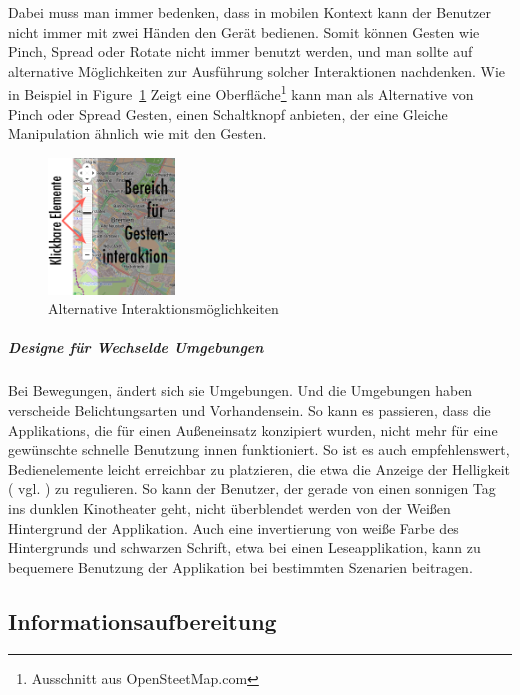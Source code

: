Dabei muss man immer bedenken, dass in mobilen Kontext kann der Benutzer nicht immer mit zwei Händen den Gerät bedienen. Somit können Gesten wie Pinch, Spread oder Rotate nicht immer benutzt werden, und man sollte auf alternative Möglichkeiten zur Ausführung solcher Interaktionen nachdenken. Wie in Beispiel in Figure~\ref{fig:nuibsp} Zeigt eine Oberfläche\footnote{Ausschnitt aus OpenSteetMap.com} kann man als Alternative von Pinch oder Spread Gesten, einen Schaltknopf anbieten, der eine Gleiche Manipulation ähnlich wie mit den Gesten.

\begin{figure}
	\begin{center}
	
	\includegraphics[width=0.3\textwidth]{img/NUIbsp.png}
	\caption{Alternative Interaktionsmöglichkeiten}\label{fig:nuibsp}
\end{center}
\end{figure}

\subparagraph{Designe für Wechselde Umgebungen} %
\label{subp:designe_f_r_au_eneinsatz}

Bei Bewegungen, ändert sich sie Umgebungen. Und die Umgebungen haben verscheide Belichtungsarten und Vorhandensein. So kann es passieren, dass die Applikations, die für einen Außeneinsatz konzipiert wurden, nicht mehr für eine gewünschte schnelle Benutzung innen funktioniert. So ist es auch empfehlenswert, Bedienelemente leicht erreichbar zu platzieren, die etwa die Anzeige der Helligkeit ( vgl. \cite[ff Seite 418]{mobileInteraces}) zu regulieren. So kann der Benutzer, der gerade von einen sonnigen Tag ins dunklen Kinotheater geht, nicht überblendet werden von der Weißen Hintergrund der Applikation. Auch eine invertierung von weiße Farbe des Hintergrunds und schwarzen Schrift, etwa bei einen Leseapplikation, kann zu bequemere Benutzung der Applikation bei bestimmten Szenarien beitragen.

\subsection{Informationsaufbereitung}
\label{sec:Informationsaufbereitung}

